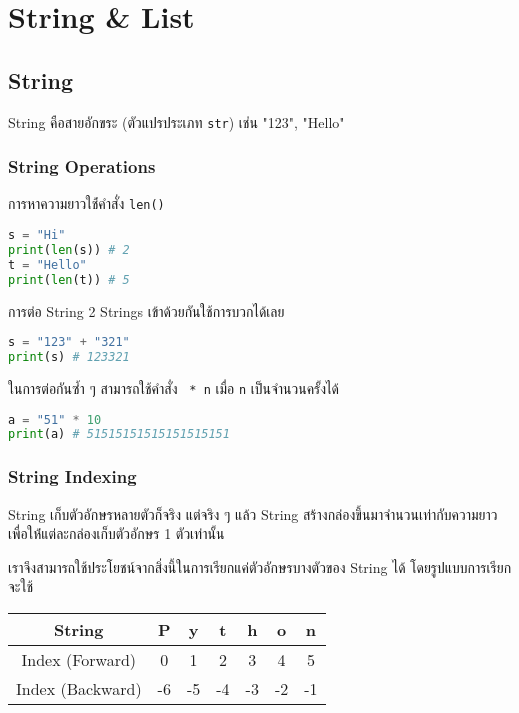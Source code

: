 \section{String \& List}

\subsection{String}

String คือสายอักขระ (ตัวแปรประเภท \verb|str|) เช่น "123", "Hello"

\subsubsection{String Operations}

การหาความยาวใช้่คำสั่ง \verb|len()|

\begin{lstlisting}[language=Python]
s = "Hi"
print(len(s)) # 2
t = "Hello"
print(len(t)) # 5
\end{lstlisting}

การต่อ String 2 Strings เข้าด้วยกันใช้การบวกได้เลย

\begin{lstlisting}[language=Python]
s = "123" + "321"
print(s) # 123321
\end{lstlisting}

ในการต่อกันซ้ำ ๆ สามารถใช้คำสั่ง \verb | * n| เมื่อ \verb|n| เป็นจำนวนครั้งได้

\begin{lstlisting}[language=Python]
a = "51" * 10
print(a) # 51515151515151515151
\end{lstlisting}

\subsubsection{String Indexing}

String เก็บตัวอักษรหลายตัวก็จริง แต่จริง ๆ แล้ว String สร้างกล่องขึ้นมาจำนวนเท่ากับความยาวเพื่อให้่แต่ละกล่องเก็บตัวอักษร 1 ตัวเท่านั้น

เราจึงสามารถใช้ประโยชน์จากสิ่งนี้ในการเรียกแค่ตัวอักษรบางตัวของ String ได้ โดยรูปแบบการเรียกจะใช้

\begin{center}
    \begin{tabular}{|c|c|c|c|c|c|c|}
         \hline
         String & P & y & t & h & o & n\\
         \hline
         Index (Forward) & 0 & 1 & 2 & 3 & 4 & 5\\
         \hline
         Index (Backward) & -6 & -5 & -4 & -3 & -2 & -1\\
         \hline
    \end{tabular}
\end{center}

